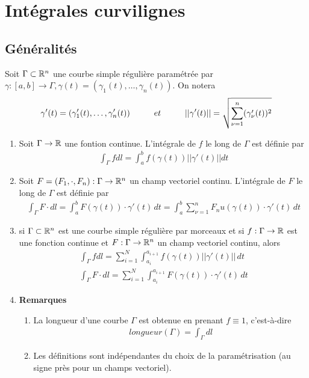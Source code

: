 \chapter[Intégrales curvilignes]{Intégrales curvilignes}

\section{Généralités}

\begin{myDefinition}
	Soit $\Gamma \subset \mathbb{R}^n$ une courbe simple régulière paramétrée par $\gamma: [a,b]\rightarrow\Gamma,\gamma(t)=(\gamma_1(t),\dots,\gamma_n(t))$. On notera
	\begin{eqnarray*}
		\gamma'(t)=(\gamma_1'(t),\dots,\gamma'_n(t))
		\hspace{10 mm} et\hspace{10 mm}
		||\gamma'(t)||=\sqrt{\sum_{\nu=1}^{n}(\gamma_\nu'(t))^2}
	\end{eqnarray*}
	
	\begin{enumerate}
		\item Soit $\Gamma\rightarrow\mathbb{R}$ une fontion continue. L'intégrale de $f$ le long de $\Gamma$ est définie par
			\begin{eqnarray*}
				\int_\Gamma f dl=\int_{a}^{b} f(\gamma(t))||\gamma'(t)||dt
			\end{eqnarray*}
		\item Soit $F=(F_1,\cdot,F_n):\Gamma\rightarrow\mathbb{R}^n$ un champ vectoriel continu. L'intégrale de $F$ le long de $\Gamma$ est définie par
			\begin{eqnarray*}
				\int_\Gamma F\cdot dl=\int_{a}^{b} F(\gamma(t))\cdot\gamma'(t)\,dt=\int_{a}^{b}\sum_{\nu=1}^{n} F_nu(\gamma(t))\cdot\gamma'(t)\,dt
			\end{eqnarray*}
		\item si $\Gamma \subset \mathbb{R}^n$ est une courbe simple régulière par morceaux et si $f:\Gamma\rightarrow\mathbb{R}$ est une fonction continue et $F:\Gamma\rightarrow\mathbb{R}^n$ un champ vectoriel continu, alors
			\begin{eqnarray*}
				\int_\Gamma f dl=\sum_{i=1}^{N}\int_{a_i}^{a_{i+1}} f(\gamma(t))||\gamma'(t)||\,dt
				\\
				\int_\Gamma F\cdot dl=\sum_{i=1}^{N}\int_{a_i}^{a_{i+1}} F(\gamma(t))\cdot\gamma'(t)\,dt
			\end{eqnarray*}
		\item {\bf Remarques}
			\begin{enumerate}
				\item 
					La longueur d'une courbe $\Gamma$ est obtenue en prenant $f\equiv1$, c'est-à-dire
					\begin{eqnarray*}
						longueur(\Gamma)=\int_\Gamma dl
					\end{eqnarray*}
				\item
					Les définitions sont indépendantes du choix de la paramétrisation (au signe près pour un champs vectoriel).
			\end{enumerate}
	\end{enumerate}
\end{myDefinition}

